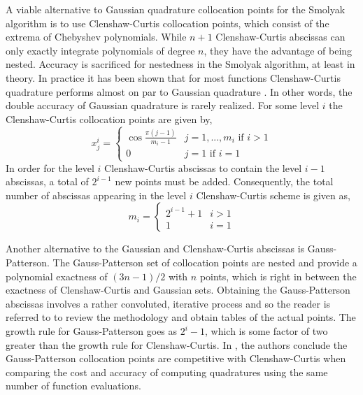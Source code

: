 A viable alternative to Gaussian quadrature collocation points for the Smolyak algorithm is to use Clenshaw-Curtis collocation points, which consist of the extrema of Chebyshev polynomials. While $n+1$ Clenshaw-Curtis abscissas can only exactly integrate polynomials of degree $n$, they have the advantage of being nested. Accuracy is sacrificed for nestedness in the Smolyak algorithm, at least in theory. In practice it has been shown that for most functions Clenshaw-Curtis quadrature performs almost on par to Gaussian quadrature \cite{TrefethenQuadrature}. In other words, the double accuracy of Gaussian quadrature is rarely realized. For some level $i$ the Clenshaw-Curtis collocation points are given by,
\begin{equation} \label{eq:cc_points}
    x_{j}^{i} = \left\{
     \begin{array}{cr}
       \cos\frac{\pi(j-1)}{m_i-1}   & j=1,...,m_i \text{ if } i>1 \\
       0   &  j=1 \text{ if } i=1
     \end{array}
   \right.
\end{equation}
In order for the level $i$ Clenshaw-Curtis abscissas to contain the level $i-1$    abscissas, a total of $2^{i-1}$ new points must be added. Consequently, the total number of abscissas appearing in the level $i$ Clenshaw-Curtis scheme is given as,
\begin{equation} \label{eq:cc_numpoints}
    m_i = \left\{
     \begin{array}{cr}
      2^{i-1}+1   & i>1 \\
      1   & i=1
     \end{array}
    \right.
\end{equation}

Another alternative to the Gaussian and Clenshaw-Curtis abscissas is Gauss-Patterson. The Gauss-Patterson set of collocation points are nested and provide  a polynomial exactness of $(3n-1)/2$ with $n$ points, which is right in between the exactness of Clenshaw-Curtis and Gaussian sets. Obtaining the Gauss-Patterson abscissas involves a rather convoluted, iterative process and so the reader is referred to \cite{GaussPatterson} to review the methodology and obtain tables of the actual points. The growth rule for Gauss-Patterson goes as $2^i-1$, which is some factor of two greater than the growth rule for Clenshaw-Curtis. In \cite{HesthavenGaussPatt}, the authors conclude the Gauss-Patterson collocation points are competitive with Clenshaw-Curtis when comparing the cost and accuracy of computing quadratures using the same number of function evaluations.       

